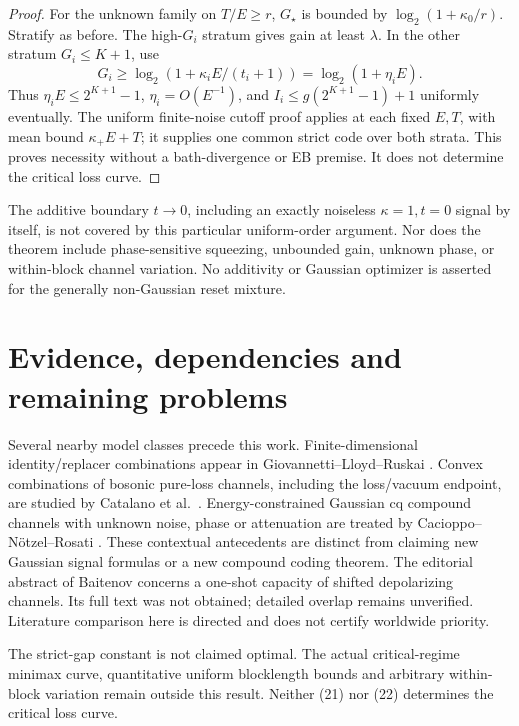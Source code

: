 \documentclass[11pt]{article}
\begin{document}
\begin{proof}
For the unknown family on \(T/E\ge r\), \(G_\star\) is bounded by
\(\log_2(1+\kappa_0/r)\). Stratify as before.
The high-\(G_i\) stratum gives gain at least \(\lambda\).
In the other stratum \(G_i\le K+1\), use
\[
 G_i\ge\log_2(1+\kappa_iE/(t_i+1))
       =\log_2(1+\eta_iE).
\]
Thus \(\eta_iE\le2^{K+1}-1\), \(\eta_i=O(E^{-1})\), and
\(I_i\le g(2^{K+1}-1)+1\) uniformly eventually.
The uniform finite-noise cutoff proof applies at each fixed \(E,T\),
with mean bound \(\kappa_+E+T\); it supplies one common strict code
over both strata. This proves necessity without a bath-divergence or
EB premise. It does not determine the critical loss curve.
\end{proof}

The additive boundary \(t\to0\), including an exactly noiseless
\(\kappa=1,t=0\) signal by itself, is not covered by this particular
uniform-order argument. Nor does the theorem include phase-sensitive
squeezing, unbounded gain, unknown phase, or within-block channel
variation. No additivity or Gaussian optimizer is asserted for the
generally non-Gaussian reset mixture.

\section{Evidence, dependencies and remaining problems}
Several nearby model classes precede this work. Finite-dimensional
identity/replacer combinations appear in
Giovannetti--Lloyd--Ruskai \cite[SectionIV.B, Eq.(34)]{glr}.
Convex combinations of bosonic pure-loss channels, including the
loss/vacuum endpoint, are studied by Catalano et al.\ \cite{fading}.
Energy-constrained Gaussian cq compound channels with unknown noise,
phase or attenuation are treated by Cacioppo--N\"otzel--Rosati
\cite{energycompound}. These contextual antecedents are distinct from
claiming new Gaussian signal formulas or a new compound coding theorem.
The editorial abstract of Baitenov \cite{baitenov} concerns a one-shot
capacity of shifted depolarizing channels. Its full text was not obtained;
detailed overlap remains unverified. Literature comparison here is
directed and does not certify worldwide priority.

The strict-gap constant is not claimed optimal. The actual
critical-regime minimax curve, quantitative uniform blocklength bounds
and arbitrary within-block variation remain outside this result.
Neither (21) nor (22) determines the critical loss curve.
\end{document}
